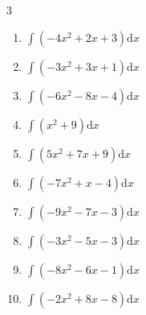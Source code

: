 \begin{multicols}{3}
\begin{enumerate}
\columnbreak %

\resetques

  \item $\displaystyle \int \left( -4x^{2}+2x+3 \right) \mathrm{d}x$


  \item $\displaystyle \int \left( -3x^{2}+3x+1 \right) \mathrm{d}x$


  \item $\displaystyle \int \left( -6x^{2}-8x-4 \right) \mathrm{d}x$


  \item $\displaystyle \int \left( x^{2}+9 \right) \mathrm{d}x$


  \item $\displaystyle \int \left( 5x^{2}+7x+9 \right) \mathrm{d}x$


  \item $\displaystyle \int \left( -7x^{2}+x-4 \right) \mathrm{d}x$


  \item $\displaystyle \int \left( -9x^{2}-7x-3 \right) \mathrm{d}x$


  \item $\displaystyle \int \left( -3x^{2}-5x-3 \right) \mathrm{d}x$


  \item $\displaystyle \int \left( -8x^{2}-6x-1 \right) \mathrm{d}x$


  \item $\displaystyle \int \left( -2x^{2}+8x-8 \right) \mathrm{d}x$



\end{enumerate}
\end{multicols}
